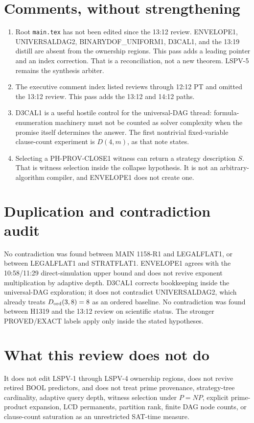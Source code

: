 \documentclass[11pt]{article}
\begin{document}
\section*{Comments, without strengthening}
\begin{enumerate}
\item Root \texttt{main.tex} has not been edited since the 13:12 review. ENVELOPE1,
UNIVERSALDAG2, BINARYDOF\_UNIFORM1, D3CAL1, and the 13:19 distill are absent from the
ownership regions. This pass adds a leading pointer and an index correction. That is a
reconciliation, not a new theorem. LSPV-5 remains the synthesis arbiter.
\item The executive comment index listed reviews through 12:12 PT and omitted the 13:12
review. This pass adds the 13:12 and 14:12 paths.
\item D3CAL1 is a useful hostile control for the universal-DAG thread: formula-enumeration
machinery must not be counted as solver complexity when the promise itself determines the
answer. The first nontrivial fixed-variable clause-count experiment is \(D(4,m)\), as that
note states.
\item Selecting a PH-PROV-CLOSE1 witness can return a strategy description \(S\). That is
witness selection inside the collapse hypothesis. It is not an arbitrary-algorithm compiler,
and ENVELOPE1 does not create one.
\end{enumerate}

\section*{Duplication and contradiction audit}
No contradiction was found between MAIN 1158-R1 and LEGALFLAT1, or between LEGALFLAT1 and
STRATFLAT1. ENVELOPE1 agrees with the 10:58/11:29 direct-simulation upper bound and does not
revive exponent multiplication by adaptive depth. D3CAL1 corrects bookkeeping inside the
universal-DAG exploration; it does not contradict UNIVERSALDAG2, which already treats
\(D_{\rm ord}(3,8)=8\) as an ordered baseline. No contradiction was found between H1319 and
the 13:12 review on scientific status. The stronger PROVED/EXACT labels apply only inside
the stated hypotheses.

\section*{What this review does not do}
It does not edit LSPV-1 through LSPV-4 ownership regions, does not revive retired BOOL
predictors, and does not treat prime provenance, strategy-tree cardinality, adaptive query
depth, witness selection under \(P=NP\), explicit prime-product expansion, LCD permanents,
partition rank, finite DAG node counts, or clause-count saturation as an unrestricted
SAT-time measure.
\end{document}

